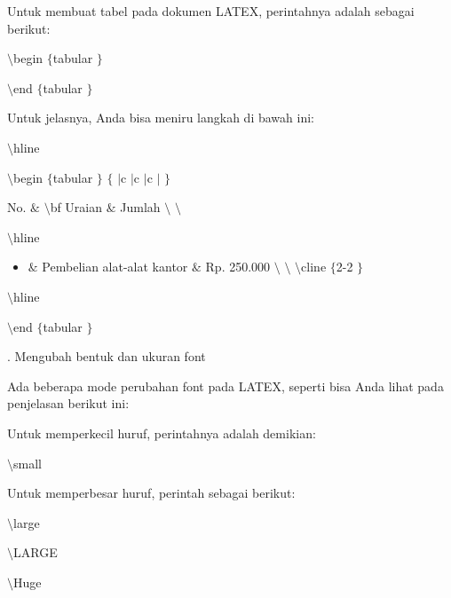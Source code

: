  Untuk membuat tabel pada dokumen LATEX, perintahnya adalah sebagai berikut: \par
{\fontsize{10pt}{10pt}\selectfont  $  \setminus  $begin $  \{  $tabular $  \}  $} \par
{\fontsize{10pt}{10pt}\selectfont  $  \setminus  $end $  \{  $tabular $  \}  $} \par
\vspace{12pt}
Untuk jelasnya, Anda bisa meniru langkah di bawah ini: \par
{\fontsize{10pt}{10pt}\selectfont  $  \setminus  $hline} \par
{\fontsize{10pt}{10pt}\selectfont  $  \setminus  $begin $  \{  $tabular $  \}  $ $  \{  $ $  \vert  $c $  \vert  $c $  \vert  $c $  \vert  $ $  \}  $} \par
{\fontsize{10pt}{10pt}\selectfont No.  $  \&  $  $  \setminus  $bf Uraian  $  \&  $ Jumlah  $  \setminus  $ $  \setminus  $} \par
{\fontsize{10pt}{10pt}\selectfont  $  \setminus  $hline} \par
\begin{itemize}
\item {\fontsize{10pt}{10pt}\selectfont  $  \&  $ Pembelian alat-alat kantor  $  \&  $ Rp. 250.000  $  \setminus  $ $  \setminus  $  $  \setminus  $cline $  \{  $2-2 $  \}  $}\end{itemize}
 \par
{\fontsize{10pt}{10pt}\selectfont  $  \setminus  $hline} \par
{\fontsize{10pt}{10pt}\selectfont  $  \setminus  $end $  \{  $tabular $  \}  $} \par
\vspace{12pt}
. Mengubah bentuk dan ukuran font \par
Ada beberapa mode perubahan font pada LATEX, seperti bisa Anda lihat pada penjelasan berikut ini:
 \par
\vspace{12pt}
Untuk memperkecil huruf, perintahnya adalah demikian: \par
 $  \setminus  $small \par
\vspace{12pt}
Untuk memperbesar huruf, perintah sebagai berikut: \par
{\fontsize{10pt}{10pt}\selectfont  $  \setminus  $large} \par
{\fontsize{10pt}{10pt}\selectfont  $  \setminus  $LARGE} \par
{\fontsize{10pt}{10pt}\selectfont  $  \setminus  $Huge} \par
